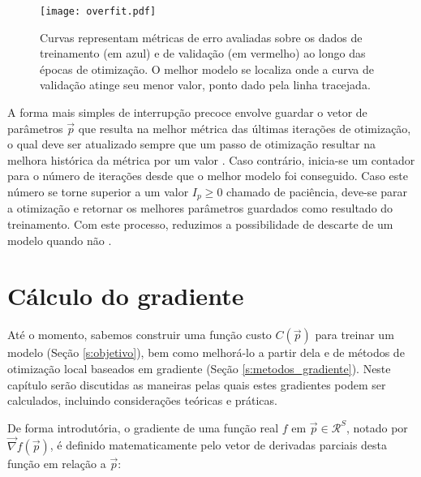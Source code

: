     \begin{figure}
      \begin{center}
        \texttt{[image: overfit.pdf]}
      \end{center}
      \caption{Curvas representam métricas de erro avaliadas sobre os dados de treinamento (em azul) e de validação (em vermelho) ao longo das épocas de otimização. O melhor modelo se localiza onde a curva de validação atinge seu menor valor, ponto dado pela linha tracejada.}
      \label{f:overfit}
    \end{figure}

    A forma mais simples de interrupção precoce envolve guardar o vetor de parâmetros $\vec{p}$ que resulta na melhor métrica das últimas iterações de otimização, o qual deve ser atualizado sempre que um passo de otimização resultar na melhora histórica da métrica por um valor \DIFdelbegin {}\DIFdelend \DIFaddbegin {}\DIFaddend . Caso contrário, inicia-se um contador para \DIFdelbegin {}\DIFdelend \DIFaddbegin {}\DIFaddend o número de iterações desde que o melhor modelo foi conseguido. Caso este número se torne superior a um valor $I_p \geq 0$ chamado de paciência, deve-se parar a otimização e retornar os melhores parâmetros guardados como resultado do treinamento. \DIFaddbegin {}\DIFaddend Com este processo, reduzimos a possibilidade de descarte de um modelo quando \DIFaddbegin {}\DIFaddend não \DIFdelbegin {}\DIFdelend \DIFaddbegin {}\DIFaddend .


\chapter{Cálculo do gradiente} \label{c:gradiente_calculo}

  Até o momento, sabemos construir uma função custo $C(\vec{p})$ para treinar um modelo (Seção \ref{s:objetivo}), bem como melhorá-lo a partir dela e de métodos de otimização local baseados em gradiente (Seção \ref{s:metodos_gradiente}). Neste capítulo serão discutidas as maneiras pelas quais estes gradientes podem ser calculados, incluindo considerações teóricas e práticas.

  De forma introdutória, o gradiente de uma função real $f$ em $\vec{p} \in \mathcal{R}^S$, notado por $\vec{\nabla} f(\vec{p})$, é definido matematicamente pelo vetor de derivadas parciais desta função em relação a $\vec{p}$:

